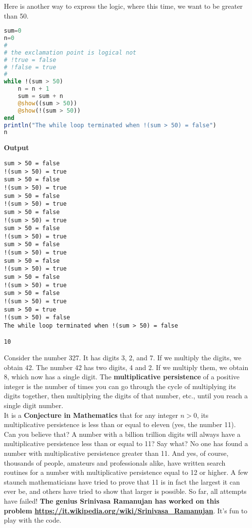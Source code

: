 Here is another way to express the logic, where this time, we want to be greater than 50.
\begin{lstlisting}[language=Julia,style=mystyle]
sum=0
n=0
#
# the exclamation point is logical not
# !true = false
# !false = true
#
while !(sum > 50)
    n = n + 1
    sum = sum + n
    @show((sum > 50))
    @show(!(sum > 50))
end
println("The while loop terminated when !(sum > 50) = false")
n 
\end{lstlisting}
\textbf{Output} 
\begin{verbatim}
sum > 50 = false
!(sum > 50) = true
sum > 50 = false
!(sum > 50) = true
sum > 50 = false
!(sum > 50) = true
sum > 50 = false
!(sum > 50) = true
sum > 50 = false
!(sum > 50) = true
sum > 50 = false
!(sum > 50) = true
sum > 50 = false
!(sum > 50) = true
sum > 50 = false
!(sum > 50) = true
sum > 50 = false
!(sum > 50) = true
sum > 50 = true
!(sum > 50) = false
The while loop terminated when !(sum > 50) = false

10
\end{verbatim}

\begin{tcolorbox}[title=\textbf{An Open Math Problem: Multiplicative Persistence}]

Consider the number 327. It has digits 3, 2, and 7. If we multiply the digits, we obtain 42. The number 42 has two digits, 4 and 2. If we multiply them, we obtain 8, which now has a single digit.  The \textbf{multiplicative persistence} of a positive integer is the number of times you can go through the cycle of multiplying its digits together, then multiplying the digits of that number, etc., until you reach a single digit number. \\

It is a \textbf{Conjecture in Mathematics} that for any integer $n >0$, its multiplicative persistence is less than or equal to eleven (yes, the number 11). Can you believe that? A number with a billion trillion digits will always have a multiplicative persistence less than or equal to 11? Say what? No one has found a number with multiplicative persistence greater than 11. And yes, of course, thousands of people, amateurs and professionals alike, have written search routines for a number with multiplicative persistence equal to 12 or higher. A few staunch mathematicians have tried to prove that 11 is in fact the largest it can ever be, and others have tried to show that larger is possible. So far, all attempts have failed! \textbf{The genius Srinivasa Ramanujan has worked on this problem \url{https://it.wikipedia.org/wiki/Srinivasa_Ramanujan}}.  It's fun to play with the code.
\end{tcolorbox} 


